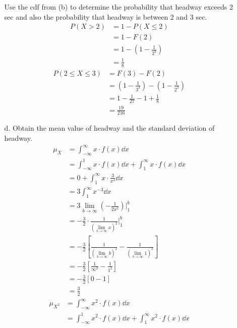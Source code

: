 \documentclass[letterpaper,12pt]{article}
\begin{document}
\begin{enumerate}
\begin{enumerate}
        Use the cdf from (b) to determine the probability that headway exceeds 2 sec and also the probability that headway is between 2 and 3 sec.
        \begin{align*}
          P(X > 2) &= 1 - P(X \le 2) \\
          &= 1 - F(2) \\
          &= 1 - \left(1 - \frac{1}{2^3}\right) \\
          &= \frac{1}{8}
        \end{align*}
        \begin{align*}
          P(2 \le X \le 3) &= F(3) - F(2) \\
          &= \left(1 - \frac{1}{3^3}\right) - \left(1 - \frac{1}{2^3}\right) \\
          &= 1 - \frac{1}{27} - 1 + \frac{1}{8} \\
          &= \frac{19}{216}
        \end{align*}
      \item[d.]
        Obtain the mean value of headway and the standard deviation of headway.
        \begin{align*}
          \mu_X &= \int_{-\infty}^{\infty} x \cdot f(x) \dd{x} \\
          &= \int_{-\infty}^{1} x \cdot f(x) \dd{x} + \int_{1}^{\infty} x \cdot f(x) \dd{x} \\
          &= 0 + \int_{1}^{\infty} x \cdot \frac{3}{x^4} \dd{x} \\
          &= 3 \int_{1}^{\infty} x^{-3} \dd{x} \\
          &= 3 \lim_{b \to \infty} \left(-\frac{1}{2x^2}\right) \bigg\rvert_{1}^{b} \\
          &= -\frac{3}{2} \cdot \frac{1}{(\lim_{b \to \infty} x)^2} \bigg\rvert_{1}^{b} \\
          &= -\frac{3}{2} \left[\frac{1}{(\lim_{b \to \infty} b)^2} - \frac{1}{(\lim_{b \to \infty} 1)^2}\right] \\
          &= -\frac{3}{2} \left[\frac{1}{\infty^2} - \frac{1}{1^2}\right] \\
          &= -\frac{3}{2} [0 - 1] \\
          &= \frac{3}{2}
        \end{align*}
        \begin{align*}
          \mu_{X^2} &= \int_{-\infty}^{\infty} x^2 \cdot f(x) \dd{x} \\
          &= \int_{-\infty}^{1} x^2 \cdot f(x) \dd{x} + \int_{1}^{\infty} x^2 \cdot f(x) \dd{x} \\

\end{align*}
\end{enumerate}
\end{enumerate}
\end{document}

